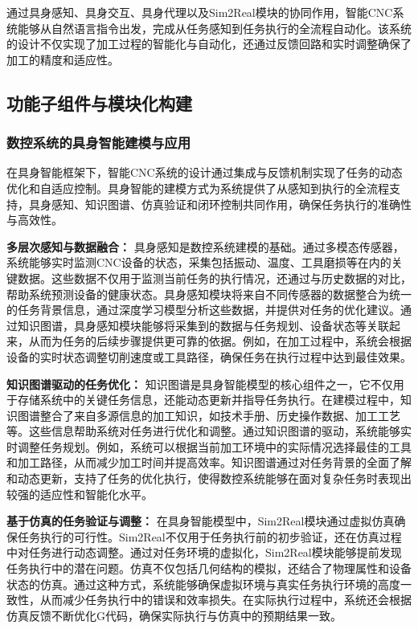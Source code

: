 \documentclass[preprint,12pt]{elsarticle}
\begin{document}
通过具身感知、具身交互、具身代理以及Sim2Real模块的协同作用，智能CNC系统能够从自然语言指令出发，完成从任务感知到任务执行的全流程自动化。该系统的设计不仅实现了加工过程的智能化与自动化，还通过反馈回路和实时调整确保了加工的精度和适应性。%


\subsection{功能子组件与模块化构建}

\subsubsection{数控系统的具身智能建模与应用}

在具身智能框架下，智能CNC系统的设计通过集成与反馈机制实现了任务的动态优化和自适应控制。具身智能的建模方式为系统提供了从感知到执行的全流程支持，具身感知、知识图谱、仿真验证和闭环控制共同作用，确保任务执行的准确性与高效性。

\textbf{多层次感知与数据融合：}  
具身感知是数控系统建模的基础。通过多模态传感器，系统能够实时监测CNC设备的状态，采集包括振动、温度、工具磨损等在内的关键数据。这些数据不仅用于监测当前任务的执行情况，还通过与历史数据的对比，帮助系统预测设备的健康状态。具身感知模块将来自不同传感器的数据整合为统一的任务背景信息，通过深度学习模型分析这些数据，并提供对任务的优化建议。通过知识图谱，具身感知模块能够将采集到的数据与任务规划、设备状态等关联起来，从而为任务的后续步骤提供更可靠的依据。例如，在加工过程中，系统会根据设备的实时状态调整切削速度或工具路径，确保任务在执行过程中达到最佳效果。

\textbf{知识图谱驱动的任务优化：}  
知识图谱是具身智能模型的核心组件之一，它不仅用于存储系统中的关键任务信息，还能动态更新并指导任务执行。在建模过程中，知识图谱整合了来自多源信息的加工知识，如技术手册、历史操作数据、加工工艺等。这些信息帮助系统对任务进行优化和调整。通过知识图谱的驱动，系统能够实时调整任务规划。例如，系统可以根据当前加工环境中的实际情况选择最佳的工具和加工路径，从而减少加工时间并提高效率。知识图谱通过对任务背景的全面了解和动态更新，支持了任务的优化执行，使得数控系统能够在面对复杂任务时表现出较强的适应性和智能化水平。

\textbf{基于仿真的任务验证与调整：}  
在具身智能模型中，Sim2Real模块通过虚拟仿真确保任务执行的可行性。Sim2Real不仅用于任务执行前的初步验证，还在仿真过程中对任务进行动态调整。通过对任务环境的虚拟化，Sim2Real模块能够提前发现任务执行中的潜在问题。仿真不仅包括几何结构的模拟，还结合了物理属性和设备状态的仿真。通过这种方式，系统能够确保虚拟环境与真实任务执行环境的高度一致性，从而减少任务执行中的错误和效率损失。在实际执行过程中，系统还会根据仿真反馈不断优化G代码，确保实际执行与仿真中的预期结果一致。
\end{document}
